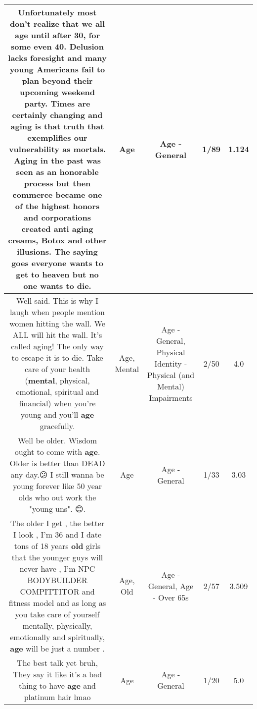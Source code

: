\documentclass[11pt]{article}
\newlength\mylength
\begin{document}
\begin{center}
\begin{longtable}{|C{.65\mylength}|C{.30\mylength}|C{.12\mylength}|C{.12\mylength}|C{.12\mylength}|}
  \small Unfortunately most don't realize that we all \textbf{age} until after 30, for some even 40. Delusion lacks foresight and many young Americans fail to plan beyond their upcoming weekend party. Times are certainly changing and aging is that truth that exemplifies our vulnerability as mortals. Aging in the past was seen as an honorable process but then commerce became one of the highest honors and corporations created anti aging creams, Botox and other illusions. The saying goes everyone wants to get to heaven but no one wants to die.\normalsize   & Age & Age - General & 1/89 & 1.124 \\  \hline
  \small Well said. This is why I laugh when people mention women hitting the wall. We ALL will hit the wall. It's called aging! The only way to escape it is to die. Take care of your health (\textbf{mental}, physical, emotional, spiritual and financial) when you're young and you'll \textbf{age} gracefully.\normalsize   & Age, Mental & Age - General, Physical Identity - Physical (and Mental) Impairments & 2/50 & 4.0 \\  \hline
  \small Well be older. Wisdom ought to come with \textbf{age}. Older is better than DEAD any day.😕 I still wanna be young forever like 50 year olds who out work the "young uns". 😊.\normalsize   & Age & Age - General & 1/33 & 3.03 \\  \hline
  \small The older I get , the better I look , I'm 36 and I date tons of 18 years \textbf{old} girls that the younger guys will never have , I'm  NPC BODYBUILDER COMPITTITOR and fitness model and as long as you take care of yourself mentally,  physically,  emotionally and spiritually,  \textbf{age} will be just a number .\normalsize   & Age, Old & Age - General, Age - Over 65s & 2/57 & 3.509 \\  \hline
  \small The best talk yet bruh, They say it like it's a bad thing to have \textbf{age} and platinum hair lmao\normalsize   & Age & Age - General & 1/20 & 5.0 \\  \hline
  
\end{longtable}
\end{center}
\end{document}
